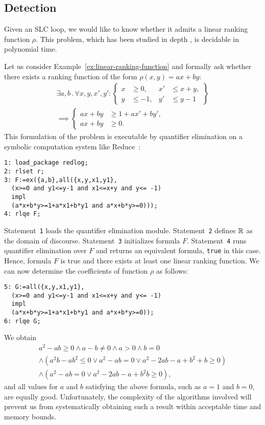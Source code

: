 \documentclass{acm_proc_article-sp}
\newcommand{\st}{\mathrel{.}}
\newcommand{\itc}{\mathrel{:}}
\begin{document}
\subsection{Detection}
\label{sec:lrf-detection}

Given an SLC loop, we would like to know whether it admits a linear ranking
function $\rho$.
This problem, which has been studied in depth
\cite{BagnaraMPZ12IC,PodelskiR04,SohnVG91},
is decidable in polynomial time.

Let us consider Example~\ref{ex:linear-ranking-function}
and formally ask whether there exists a ranking function of the form
$\rho(x, y) = a x + b y$:
\begin{multline}
\label{formule-fnrglin}
  \exists a, b \st \forall x, y, x', y' \itc
    \left\{
      \begin{aligned}
        x  &\ge 0,  & x' &\le x+y, \\
        y  &\le -1, & y' &\le y-1
      \end{aligned}
    \right\} \\
  \implies
    \left\{
      \begin{aligned}
        a x + b y &\ge 1 +  a x' + b y', \\
        a x + b y &\ge 0.
      \end{aligned}
    \right.
\end{multline}
This formulation of the problem is executable by quantifier
elimination on a symbolic computation system like
Reduce~\cite{Hearn05}:
\begin{verbatim}
1: load_package redlog;
2: rlset r;
3: F:=ex({a,b},all({x,y,x1,y1},
  (x>=0 and y1<=y-1 and x1<=x+y and y<= -1)
  impl
  (a*x+b*y>=1+a*x1+b*y1 and a*x+b*y>=0)));
4: rlqe F;
\end{verbatim}
Statement~\texttt{1} loads the quantifier elimination module.
Statement~\texttt{2} defines $\mathbb{R}$ as the domain of discourse.
Statement~\texttt{3} initializes formula $F$.
Statement~\texttt{4} runs quantifier elimination over $F$ and returns
an equivalent formula, \texttt{true} in this case.
Hence, formula $F$ is true and there exists at least one linear
ranking function.
We can now determine the coefficients of function $\rho$ as follows:
\begin{verbatim}
5: G:=all({x,y,x1,y1},
  (x>=0 and y1<=y-1 and x1<=x+y and y<= -1)
  impl
  (a*x+b*y>=1+a*x1+b*y1 and a*x+b*y>=0));
6: rlqe G;
\end{verbatim}
We obtain
\begin{multline*}
  a^2 - ab \geq 0 \land a - b \neq 0 \land a > 0  \land b = 0 \\
  \land (a^2b - ab^2 \leq 0 \lor a^2 -ab = 0
         \lor a^2 - 2ab - a + b^2 + b \geq 0) \\
  \land (a^2 - ab = 0 \lor a^2 -2ab - a + b^2 b \geq 0),
\end{multline*}
and all values for $a$ and $b$ satisfying the above formula,
such as $a = 1$ and $b = 0$, are equally good.
Unfortunately, the complexity of the algorithms involved
will prevent us from systematically obtaining such a result
within acceptable time and memory bounds.
\end{document}
